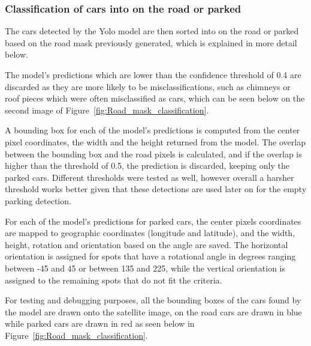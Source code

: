 \newpage

\subsubsection{Classification of cars into on the road or parked}
The cars detected by the Yolo model are then sorted into on the road or parked based on the road mask previously generated, which is explained in more detail below.

The model's predictions which are lower than the confidence threshold of 0.4 are discarded as they are more likely to be misclassifications, such as chimneys or roof pieces which were often misclassified as cars, which can be seen below on the second image of Figure~\ref{fig:Road_mask_classification}.

A bounding box for each of the model's predictions is computed from the center pixel coordinates, the width and the height returned from the model.
The overlap between the bounding box and the road pixels is calculated, and if the overlap is higher than the threshold of 0.5, the prediction is discarded, keeping only the parked cars.
Different thresholds were tested as well, however overall a harsher threshold works better given that these detections are used later on for the empty parking detection.

For each of the model's predictions for parked cars, the center pixels coordinates are mapped to geographic coordinates (longitude and latitude), and the width, height, rotation and orientation based on the angle are saved. The horizontal orientation is assigned for spots that have a rotational angle in degrees ranging between -45 and 45 or between 135 and 225, while the vertical orientation is assigned to the remaining spots that do not fit the criteria.

For testing and debugging purposes, all the bounding boxes of the cars found by the model are drawn onto the satellite image, on the road cars are drawn in blue while parked cars are drawn in red as seen below in Figure~\ref{fig:Road_mask_classification}.

